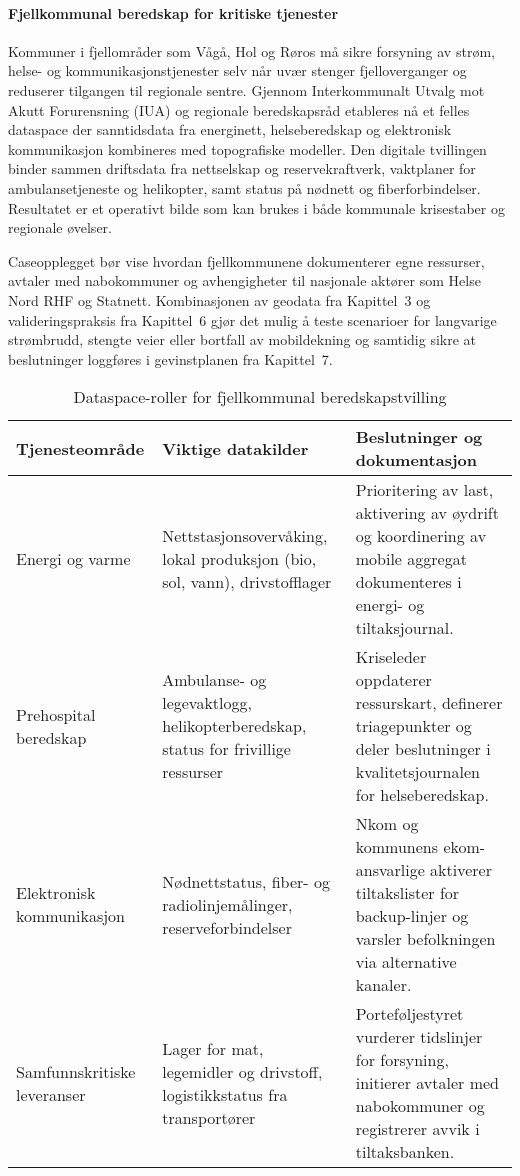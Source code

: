 \paragraph{Fjellkommunal beredskap for kritiske tjenester}
Kommuner i fjellområder som Vågå, Hol og Røros må sikre forsyning av strøm, helse- og kommunikasjonstjenester selv når uvær stenger fjelloverganger og reduserer tilgangen til regionale sentre. Gjennom Interkommunalt Utvalg mot Akutt Forurensning (IUA) og regionale beredskapsråd etableres nå et felles dataspace der sanntidsdata fra energinett, helseberedskap og elektronisk kommunikasjon kombineres med topografiske modeller.\citep{dsb2023beredskapsplikt,nkom2023robustekommunikasjon} Den digitale tvillingen binder sammen driftsdata fra nettselskap og reservekraftverk, vaktplaner for ambulansetjeneste og helikopter, samt status på nødnett og fiberforbindelser. Resultatet er et operativt bilde som kan brukes i både kommunale krisestaber og regionale øvelser.

Caseopplegget bør vise hvordan fjellkommunene dokumenterer egne ressurser, avtaler med nabokommuner og avhengigheter til nasjonale aktører som Helse Nord RHF og Statnett.\citep{helsenord2023beredskap,nve2023lokalenergi} Kombinasjonen av geodata fra Kapittel~3 og valideringspraksis fra Kapittel~6 gjør det mulig å teste scenarioer for langvarige strømbrudd, stengte veier eller bortfall av mobildekning og samtidig sikre at beslutninger loggføres i gevinstplanen fra Kapittel~7.

\begin{table}[h]
    \centering
    \caption{Dataspace-roller for fjellkommunal beredskapstvilling}
    \label{tab:fjellkommunal-beredskap}
    \begin{tabular}{p{3.6cm}p{4.4cm}p{4.8cm}}
        \toprule
        Tjenesteområde & Viktige datakilder & Beslutninger og dokumentasjon \\
        \midrule
        Energi og varme & Nettstasjonsovervåking, lokal produksjon (bio, sol, vann), drivstofflager & Prioritering av last, aktivering av øydrift og koordinering av mobile aggregat dokumenteres i energi- og tiltaksjournal.\\
        Prehospital beredskap & Ambulanse- og legevaktlogg, helikopterberedskap, status for frivillige ressurser & Kriseleder oppdaterer ressurskart, definerer triagepunkter og deler beslutninger i kvalitetsjournalen for helseberedskap.\\
        Elektronisk kommunikasjon & Nødnettstatus, fiber- og radiolinjemålinger, reserveforbindelser & Nkom og kommunens ekom-ansvarlige aktiverer tiltakslister for backup-linjer og varsler befolkningen via alternative kanaler.\\
        Samfunnskritiske leveranser & Lager for mat, legemidler og drivstoff, logistikkstatus fra transportører & Porteføljestyret vurderer tidslinjer for forsyning, initierer avtaler med nabokommuner og registrerer avvik i tiltaksbanken.\\
        \bottomrule
    \end{tabular}
\end{table}

